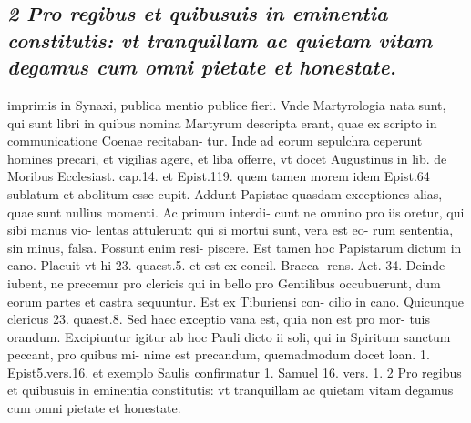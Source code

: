 \documentclass{article}
\begin{document}
\begin{pages}
\subsection*{\textit{2 Pro regibus et quibusuis in eminentia constitutis: vt tranquillam ac quietam vitam degamus cum omni pietate et honestate.}}imprimis in Synaxi, publica mentio publice fieri. Vnde Martyrologia nata sunt, qui sunt libri in quibus nomina Martyrum descripta erant, quae ex scripto in communicatione Coenae recitaban- tur. Inde ad eorum sepulchra ceperunt homines precari, et vigilias agere, et liba offerre, vt docet Augustinus in lib.  de Moribus Ecclesiast. cap.14. et Epist.119. quem tamen morem idem Epist.64 sublatum et abolitum esse cupit. Addunt Papistae quasdam exceptiones alias, quae sunt nullius momenti. Ac primum interdi- cunt ne omnino pro iis oretur, qui sibi manus vio- lentas attulerunt: qui si mortui sunt, vera est eo- rum sententia, sin minus, falsa. Possunt enim resi- piscere. Est tamen hoc Papistarum dictum in cano. Placuit vt hi 23. quaest.5. et est ex concil. Bracca- rens. Act. 34. Deinde iubent, ne precemur pro clericis qui in bello pro Gentilibus occubuerunt, dum eorum partes et castra sequuntur. Est ex Tiburiensi con- cilio in cano. Quicunque clericus 23. quaest.8. Sed haec exceptio vana est, quia non est pro mor- tuis orandum. Excipiuntur igitur ab hoc Pauli dicto ii soli, qui in Spiritum sanctum peccant, pro quibus mi- nime est precandum, quemadmodum docet loan. 1. Epist5.vers.16. et exemplo Saulis confirmatur 1. Samuel 16. vers. 1. 2 Pro regibus et quibusuis in eminentia constitutis: vt tranquillam ac quietam vitam degamus cum omni pietate et honestate.  \pend

\end{pages}
\end{document}
